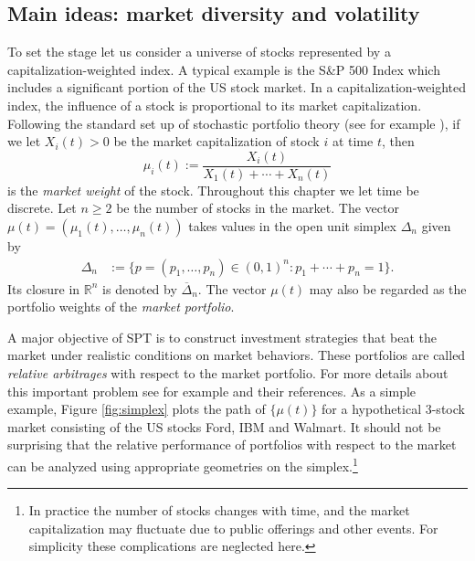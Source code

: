 \documentclass[graybox]{svmult}
\begin{document}
\subsection{Main ideas: market diversity and volatility} \label{sec:main.idea}
To set the stage let us consider a universe of stocks represented by a capitalization-weighted index. A typical example is the S\&P 500 Index which includes a significant portion of the US stock market. In a capitalization-weighted index, the influence of a stock is proportional to its market capitalization. Following the standard set up of stochastic portfolio theory (see for example \cite{F02, FK09}), if we let $X_i(t) > 0$ be the market capitalization of stock $i$ at time $t$, then
\begin{equation} \label{eqn:market.weight}
\mu_i(t) := \frac{X_i(t)}{X_1(t) + \cdots + X_n(t)}
\end{equation}
is the {\it market weight} of the stock. Throughout this chapter we let time be discrete. Let $n \geq 2$ be the number of stocks in the market. The vector $\mu(t) = (\mu_1(t), \ldots, \mu_n(t))$ takes values in the open unit simplex $\Delta_n$ given by
\begin{equation*}
\begin{split}
\Delta_n &:= \{p = (p_1, \ldots, p_n) \in (0, 1)^n: p_1 + \cdots + p_n = 1\}.
\end{split}
\end{equation*}
Its closure in $\mathbb{R}^n$ is denoted by $\overline{\Delta}_n$.  The vector $\mu(t)$ may also be regarded as the portfolio weights of the {\it market portfolio}. 

A major objective of SPT is to construct investment strategies that beat the market under  realistic conditions on market behaviors. These portfolios are called {\it relative arbitrages} with respect to the market portfolio. For more details about this important problem see for example \cite{F02, FK09, FKR17} and their references. As a simple example, Figure \ref{fig:simplex} plots the path of $\{\mu(t)\}$ for a hypothetical $3$-stock market consisting of the US stocks Ford, IBM and Walmart. It should not be surprising that the relative performance of portfolios with respect to the market can be analyzed using appropriate geometries on the simplex.\footnote{In practice the number of stocks changes with time, and the market capitalization may fluctuate due to public offerings and other events. For simplicity these complications are neglected here.}
\end{document}
